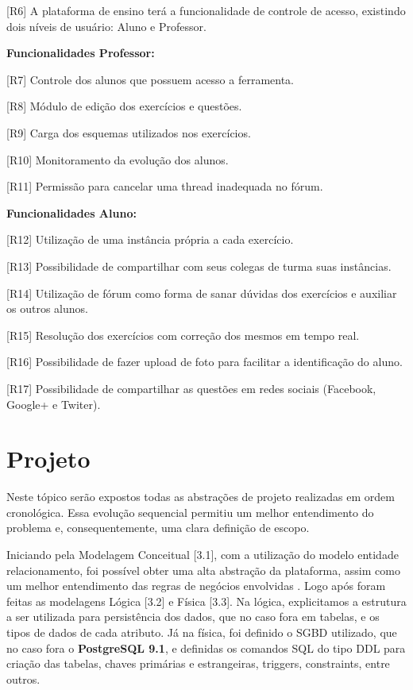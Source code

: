 \documentclass[graduacao,brazil]{ThesisPUC}
\begin{document}
[R6] A plataforma de ensino ter\'{a} a funcionalidade de controle de acesso, existindo dois n\'{i}veis de usu\'{a}rio:
Aluno e Professor.

\textbf{Funcionalidades Professor:}

[R7] Controle dos alunos que possuem acesso a ferramenta.

[R8] M\'{o}dulo de edi\c{c}\~{a}o dos exerc\'{i}cios e quest\~{o}es.

[R9] Carga dos esquemas utilizados nos exerc\'{i}cios.

[R10] Monitoramento da evolu\c{c}\~{a}o dos alunos.

[R11] Permiss\~{a}o para cancelar uma thread inadequada no f\'{o}rum.

\textbf{Funcionalidades Aluno:}

[R12] Utiliza\c{c}\~{a}o de uma inst\^{a}ncia pr\'{o}pria a cada exerc\'{i}cio.

[R13] Possibilidade de compartilhar com seus colegas de turma suas inst\^{a}ncias.

[R14] Utiliza\c{c}\~{a}o de f\'{o}rum como forma de sanar d\'{u}vidas dos exerc\'{i}cios e auxiliar os outros alunos.

[R15] Resolu\c{c}\~{a}o dos exerc\'{i}cios com corre\c{c}\~{a}o dos mesmos em tempo real.

[R16] Possibilidade de fazer upload de foto para facilitar a identifica\c{c}\~{a}o do aluno.

[R17] Possibilidade de compartilhar as quest\~{o}es em redes sociais (Facebook, Google+ e Twiter).


\chapter{Projeto}

Neste t\'{o}pico ser\~{a}o expostos todas as abstra\c{c}\~{o}es de projeto realizadas em ordem
cronol\'{o}gica. Essa evolu\c{c}\~{a}o sequencial permitiu um melhor entendimento do problema e,
consequentemente, uma clara defini\c{c}\~{a}o de escopo.

Iniciando pela Modelagem Conceitual [3.1], com a utiliza\c{c}\~{a}o do modelo entidade
relacionamento, foi poss\'{i}vel obter uma alta abstra\c{c}\~{a}o da plataforma, assim como um melhor
entendimento das regras de neg\'{o}cios envolvidas \cite{Heuser09}. Logo ap\'{o}s foram feitas as modelagens L\'{o}gica
[3.2] e F\'{i}sica [3.3]. Na l\'{o}gica, explicitamos a estrutura a ser utilizada para persist\^{e}ncia dos dados,
que no caso fora em tabelas, e os tipos de dados de cada atributo. J\'{a} na f\'{i}sica, foi definido o
SGBD utilizado, que no caso fora o \textbf{PostgreSQL 9.1}, e definidas os comandos SQL do tipo DDL
para criação das tabelas, chaves primárias e estrangeiras, triggers, constraints, entre outros.
\end{document}
